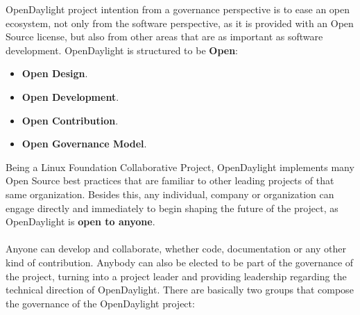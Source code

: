 \documentclass[a4paper, 12pt]{book}
\begin{document}
OpenDaylight project intention from a governance perspective is to ease an open ecosystem, not only from the software perspective, as it is provided with an Open Source license, but also from other areas that are as important as software development. OpenDaylight is structured to be \textbf{Open}:
\begin{itemize}\itemsep0pt
\item{\textbf{Open Design}}.
\item{\textbf{Open Development}}.
\item{\textbf{Open Contribution}}.
\item{\textbf{Open Governance Model}}.
\end{itemize}
Being a Linux Foundation Collaborative Project, OpenDaylight implements many Open Source best practices that are familiar to other leading projects of that same organization. Besides this, any individual, company or organization can engage directly and immediately to begin shaping the future of the project, as OpenDaylight is \textbf{open to anyone}.\\
\\
Anyone can develop and collaborate, whether code, documentation or any other kind of contribution. Anybody can also be elected to be part of the governance of the project, turning into a project leader and providing leadership regarding the technical direction of OpenDaylight. There are basically two groups that compose the governance of the OpenDaylight project:
\end{document}
